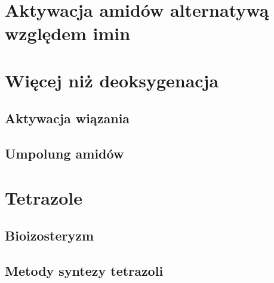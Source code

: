 \section{Aktywacja amidów alternatywą względem imin}\label{literature:imine-alternaive}

\section{Więcej niż deoksygenacja}\label{literature:other}
\subsection{Aktywacja wiązania }\label{literature:other:c-n}
\subsection{Umpolung amidów}\label{literature:other:umpolung}

\section{Tetrazole}\label{literature:tetrazole}
\subsection{Bioizosteryzm}\label{literature:tetrazole:bioisosterizm}
\subsection{Metody syntezy tetrazoli}\label{literature:tetrazole:synthesis}
